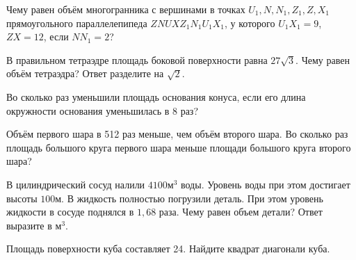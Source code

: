\documentclass[4apaper]{article}
\begin{document}
\begin{taskBN}{1}
Чему равен объём многогранника с вершинами в точках $U_1,N,N_1,Z_1,Z,X_1$ прямоугольного параллелепипеда $ZNUXZ_1N_1U_1X_1$, у которого $U_1X_1 = 9$, $ZX = 12$, если $NN_1=2$? 
\end{taskBN}

\begin{taskBN}{2}
В правильном тетраэдре площадь боковой поверхности равна $27\sqrt{3}$. Чему равен объём тетраэдра? Ответ разделите на $\sqrt{2}$.
\end{taskBN}

\begin{taskBN}{3}
Во сколько раз уменьшили площадь основания конуса, если его длина окружности основания уменьшилась в 8 раз?
\end{taskBN}

\begin{taskBN}{4}
Объём первого шара в 512 раз меньше, чем объём второго шара. Во сколько раз площадь большого круга первого шара меньше площади большого круга второго шара?
\end{taskBN}

\begin{taskBN}{5}
В цилиндрический сосуд налили $4100\mbox{м}^3$ воды. Уровень воды при этом достигает высоты $100$м. В жидкость полностью погрузили деталь. При этом уровень жидкости в сосуде поднялся в $ 1{,}68 $ раза. Чему равен объем детали? Ответ выразите в $\mbox{м}^3$.
\end{taskBN}

\begin{taskBN}{6}
Площадь поверхности куба составляет 24. Найдите квадрат диагонали куба.
\end{taskBN}
\end{document}
